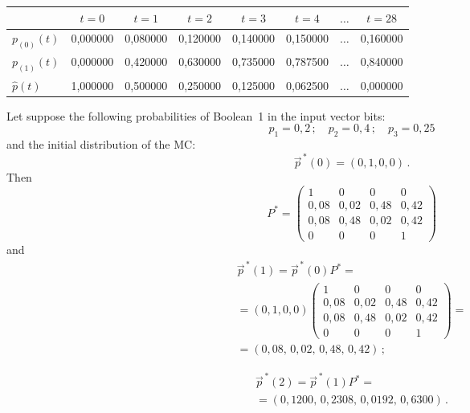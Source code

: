 \begin{multicols}{2}
\begin{table*}
\begin{center}
\begin{tabular}{lccccccc}
\hline
       & $t=0$ & $t=1$ & $t=2$ & $t=3$ & $t=4$ & $\ldots$ & $t=28$  \\
\hline
$p_{(0)}(t)$
       & 0,000000 & 0,080000 & 0,120000 & 0,140000 & 0,150000
                      & $\ldots$ & 0,160000 \\
$p_{(1)}(t)$
       & 0,000000 & 0,420000 & 0,630000 & 0,735000 & 0,787500
                      & $\ldots$ & 0,840000 \\
$\hat p(t)$
       & 1,000000 & 0,500000 & 0,250000 & 0,125000 & 0,062500
                      & $\ldots$ & 0,000000 \\
\hline
\end{tabular}
\end{center}
\end{table*}

Let suppose the following probabilities of Boolean~1
in the input vector bits:
$$
p_1=0{{,}}2\,;\quad
p_2=0{,}4\,;\quad
p_3=0{,}25
$$
and the initial distribution of the MC:
$$
\vec p^{\,*}(0) = (0,1,0,0)\,.
$$
Then
$$
P^*
=
\begin{pmatrix}
1      &   0    &   0    &   0       \\
0{,}08 & 0{,}02 & 0{,}48 &  0{,}42   \\
0{,}08 & 0{,}48 & 0{,}02 &  0{,}42   \\
0      &   0    & 0      &   1
\end{pmatrix}
$$
and
\begin{multline*}
\vec p^{\,*}(1)
=
\vec p^{\,*}(0) P^*
={}\\
{}=
(0,1,0,0)
\begin{pmatrix}
1      &   0    &   0    &   0       \\
0{,}08 & 0{,}02 & 0{,}48 &  0{,}42   \\
0{,}08 & 0{,}48 & 0{,}02 &  0{,}42   \\
0      &   0    & 0      &   1
\end{pmatrix}={}\\
{}= (0{,}08,\,0{,}02,\,0{,}48,\,0{,}42)\,;
\end{multline*}

\vspace*{-6pt}

\noindent
\begin{multline*}
\vec p^{\,*}(2)
=
\vec p^{\,*}(1) P^*
={}\\
{}=
(0{,}1200,\,0{,}2308,\,0{,}0192,\,0{,}6300)\,.
\end{multline*}


\end{multicols}
